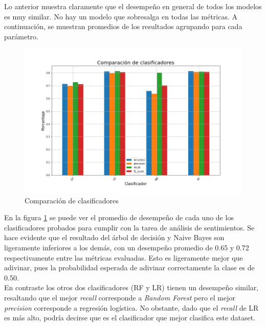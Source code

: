 

Lo anterior muestra claramente que el desempeño en general de todos los modelos es muy similar. No hay un modelo que sobresalga en todas las métricas. A continuación, se muestran promedios de los resultados agrupando para cada parámetro.

\begin{figure}[H]
    \centering
    \includegraphics[scale = 0.45]{results/classifier_comparison.png}
    \caption{Comparación de clasificadores}
    \label{fig:classifier_comparisson}
\end{figure}

En la figura \ref{fig:classifier_comparisson} se puede ver el promedio de desempeño de cada uno de los clasificadores probados para cumplir con la tarea de análisis de sentimientos. Se hace evidente que el resultado del árbol de decisión y Naive Bayes son ligeramente inferiores a los demás, con un desempeño promedio de 0.65 y 0.72 respectivamente entre las métricas evaluadas. Esto es ligeramente mejor que adivinar, pues la probabilidad esperada de adivinar correctamente la clase es de 0.50.\\

En contraste los otros dos clasificadores (RF y LR) tienen un desempeño similar, resaltando que el mejor \textit{recall} corresponde a \textit{Random Forest} pero el mejor \textit{precision} corresponde a regresión logística. No obstante, dado que el \textit{recall} de LR es más alto, podría decirse que es el clasificador que mejor clasifica este dataset. 

